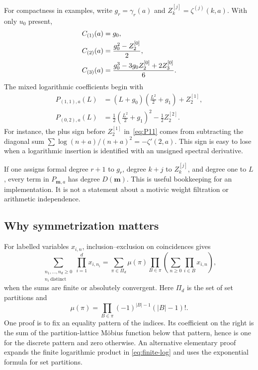 \documentclass[11pt,oneside]{article}
\numberwithin{equation}{section}
\theoremstyle{definition}
\theoremstyle{remark}
\newcommand{\mm}{\mathbf m}
\begin{document}
For compactness in examples, write $g_r=\gamma_r(a)$ and
$Z_k^{[j]}=\zeta^{(j)}(k,a)$. With only $u_0$ present,
\begin{align}
C_{(1)}(a)&=g_0,\notag\\
C_{(2)}(a)&=\frac{g_0^2-Z_2^{[0]}}2,\notag\\
C_{(3)}(a)&=\frac{g_0^3-3g_0Z_2^{[0]}+2Z_3^{[0]}}6.
\label{eq:C-first}
\end{align}
The mixed logarithmic coefficients begin with
\begin{align}
P_{(1,1),a}(L)
 &=(L+g_0)\left(\frac{L^2}{2}+g_1\right)+Z_2^{[1]},
 \label{eq:P11}\\
P_{(0,2),a}(L)
 &=\frac12\left(\frac{L^2}{2}+g_1\right)^2-\frac12 Z_2^{[2]}.
 \label{eq:P02}
\end{align}
For instance, the plus sign before $Z_2^{[1]}$ in~\eqref{eq:P11} comes from
subtracting the diagonal sum $\sum\log(n+a)/(n+a)^2=-\zeta'(2,a)$.
This sign is easy to lose when a logarithmic insertion is identified with an
unsigned spectral derivative.

If one assigns formal degree $r+1$ to $g_r$, degree $k+j$ to $Z_k^{[j]}$,
and degree one to $L$, every term in $P_{\mm,a}$ has degree $D(\mm)$.
This is useful bookkeeping for an implementation. It is not a statement
about a motivic weight filtration or arithmetic independence.

\subsection{Why symmetrization matters}

For labelled variables $x_{i,n}$, inclusion--exclusion on coincidences gives
\begin{equation}\label{eq:partition}
\sum_{\substack{n_1,\ldots,n_d\ge0\\n_i\ \mathrm{distinct}}}
 \prod_{i=1}^d x_{i,n_i}
=
\sum_{\pi\in\Pi_d}\mu(\pi)
 \prod_{B\in\pi}\left(\sum_{n\ge0}\prod_{i\in B}x_{i,n}\right),
\end{equation}
when the sums are finite or absolutely convergent. Here $\Pi_d$ is the set of
set partitions and
\[
\mu(\pi)=\prod_{B\in\pi}(-1)^{|B|-1}(|B|-1)!.
\]
One proof is to fix an equality pattern of the indices. Its coefficient on
the right is the sum of the partition-lattice M\"obius function below that
pattern, hence is one for the discrete pattern and zero otherwise. An
alternative elementary proof expands the finite logarithmic product in
\eqref{eq:finite-log} and uses the exponential formula for set partitions.
\end{document}
